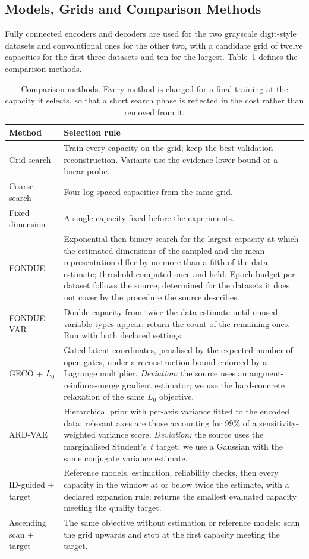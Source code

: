 \documentclass[make,article,submit,pdftex,moreauthors]{Definitions/mdpi}
\begin{document}
\subsection{Models, Grids and Comparison Methods}\label{sec:setup_methods}

Fully connected encoders and decoders are used for the two
grayscale digit-style datasets and convolutional ones for the other two,
with a candidate grid of twelve capacities for the first three datasets
and ten for the largest. Table~\ref{tab:methods_def} defines the
comparison methods.

\begin{table}[H]
\caption{Comparison methods. Every method is charged for a final training
at the capacity it selects, so that a short search phase is reflected in
the cost rather than removed from it.}
\label{tab:methods_def}
\begin{tabularx}{\textwidth}{lX}
\toprule
\textbf{Method} & \textbf{Selection rule} \\
\midrule
Grid search & Train every capacity on the grid; keep the best validation
reconstruction. Variants use the evidence lower bound or a linear probe. \\
Coarse search & Four log-spaced capacities from the same grid. \\
Fixed dimension & A single capacity fixed before the experiments. \\
FONDUE & Exponential-then-binary search for the largest capacity at which
the estimated dimensions of the sampled and the mean representation differ
by no more than a fifth of the data estimate; threshold computed once and
held. Epoch budget per dataset follows the source, determined for the
datasets it does not cover by the procedure the source describes. \\
FONDUE-VAR & Double capacity from twice the data estimate until unused
variable types appear; return the count of the remaining ones. Run with
both declared settings. \\
GECO + $L_0$ & Gated latent coordinates, penalised by the expected number
of open gates, under a reconstruction bound enforced by a Lagrange
multiplier. \emph{Deviation:} the source uses an augment-reinforce-merge
gradient estimator; we use the hard-concrete relaxation of the same
$L_0$ objective. \\
ARD-VAE & Hierarchical prior with per-axis variance fitted to the encoded
data; relevant axes are those accounting for 99\% of a
sensitivity-weighted variance score. \emph{Deviation:} the source uses the
marginalised Student's~$t$ target; we use a Gaussian with the same
conjugate variance estimate. \\
ID-guided + target & Reference models, estimation, reliability checks,
then every capacity in the window at or below twice the estimate, with a
declared expansion rule; returns the smallest evaluated capacity meeting
the quality target. \\
Ascending scan + target & The same objective without estimation or
reference models: scan the grid upwards and stop at the first capacity
meeting the target. \\
\bottomrule
\end{tabularx}
\end{table}
\end{document}
